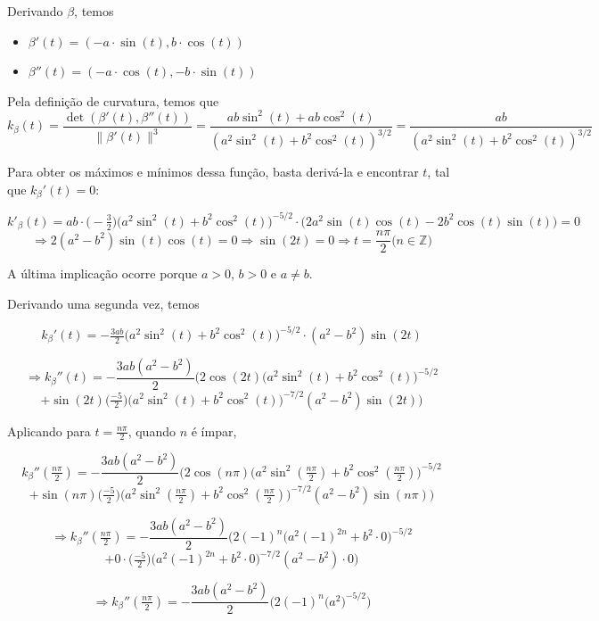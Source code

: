 \documentclass[../main.tex]{subfiles}
\begin{document}
\begin{solucao}
	Derivando $\beta$, temos
	\begin{itemize}
		\item $\beta'(t)=(-a\cdot \sin(t), b\cdot \cos(t))$
		\item $\beta''(t)=(-a\cdot \cos(t), -b\cdot \sin(t))$
	\end{itemize}
	
	Pela definição de curvatura, temos que
	{\footnotesize
		\[
		k_{\beta}(t) = \frac{\det(\beta'(t),\beta''(t))}{\|\beta'(t)\|^3} = \frac{ab\sin^2(t) + ab\cos^2(t)}{(a^2\sin^2(t)+b^2\cos^2(t))^{3/2}} = \frac{ab}{(a^2\sin^2(t)+b^2\cos^2(t))^{3/2}}
		\]
	}
	
	Para obter os máximos e mínimos dessa função, basta derivá-la e encontrar $t$, tal que $k_\beta'(t)=0$:
	
	{\footnotesize
		\[
		k'_{\beta}(t) = ab \cdot \Big(-\tfrac{3}{2}\Big)
		\big(a^2\sin^2(t) + b^2\cos^2(t)\big)^{-5/2}
		\cdot \big(2a^2\sin(t)\cos(t) - 2b^2\cos(t)\sin(t)\big)=0
		\]
		\[
		\Rightarrow 2(a^2-b^2)\sin(t)\cos(t)=0\Rightarrow \sin(2t)=0\Rightarrow t=\frac{n\pi}{2}(n\in \mathbb{Z)}
		\]
	}
	
	A última implicação ocorre porque $a > 0$, $b > 0$ e $a\neq b$.
	
	Derivando uma segunda vez, temos
	
	\[
	k_\beta'(t)=-\tfrac{3ab}{2}
	\big(a^2\sin^2(t) + b^2\cos^2(t)\big)^{-5/2}
	\cdot (a^2-b^2)\sin(2t)
	\]
	
	\[
	\Rightarrow k_\beta''(t)=-\frac{3ab(a^2-b^2)}{2}\bigg(2\cos(2t)\big(a^2\sin^2(t) + b^2\cos^2(t)\big)^{-5/2}
	\]
	\[
	+\sin(2t)\big(\tfrac{-5}{2}\big)\big(a^2\sin^2(t)+b^2\cos^2(t)\big)^{-7/2}(a^2-b^2)\sin(2t)\bigg)
	\]
	
	Aplicando para $t=\frac{n\pi}{2}$, quando $n$ é ímpar,
	
	\[
	k_\beta''(\tfrac{n\pi}{2})=-\frac{3ab(a^2-b^2)}{2}\bigg(2\cos(n\pi)\big(a^2\sin^2(\tfrac{n\pi}{2}) + b^2\cos^2(\tfrac{n\pi}{2})\big)^{-5/2}
	\]
	\[
	+\sin(n\pi)\big(\tfrac{-5}{2}\big)\big(a^2\sin^2(\tfrac{n\pi}{2})+b^2\cos^2(\tfrac{n\pi}{2})\big)^{-7/2}(a^2-b^2)\sin(n\pi)\bigg)
	\]
	
	\[
	\Rightarrow k_\beta''(\tfrac{n\pi}{2})=-\frac{3ab(a^2-b^2)}{2}\bigg(2(-1)^n\big(a^2(-1)^{2n} + b^2\cdot 0\big)^{-5/2}
	\]
	\[
	+0\cdot \big(\tfrac{-5}{2}\big)\big(a^2(-1)^{2n}+b^2\cdot 0\big)^{-7/2}(a^2-b^2)\cdot 0\bigg)
	\]
	
	\[
	\Rightarrow k_\beta''(\tfrac{n\pi}{2})=-\frac{3ab(a^2-b^2)}{2}\bigg(2(-1)^n\big(a^2)^{-5/2}\bigg)
	\]
	

\end{solucao}
\end{document}
